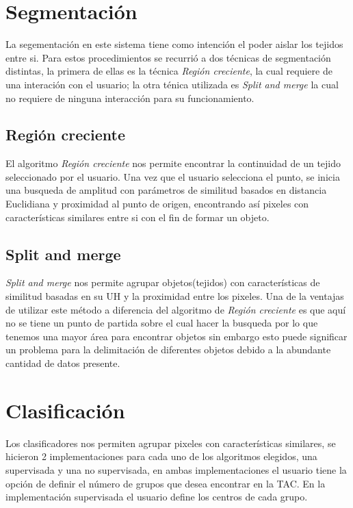 \documentclass[12pt]{report}
\begin{document}
\section{Segmentación}
La segementación en este sistema tiene como intención el poder aislar los tejidos entre si. Para estos procedimientos se recurrió  a dos técnicas de segmentación distintas, la primera de ellas es la técnica \textit{Región creciente}, la cual requiere de una interación con el usuario; la otra ténica utilizada es \textit{Split and merge} la cual no requiere de ninguna interacción para su funcionamiento.

\subsection{Región creciente}
El algoritmo \textit{Región creciente} nos permite encontrar la continuidad de un tejido seleccionado por el usuario. Una vez que el usuario selecciona el punto, se inicia una busqueda de amplitud con parámetros de similitud basados en distancia Euclidiana y proximidad al punto de origen, encontrando así pixeles con características similares entre si con el fin de formar un objeto.

\subsection{Split and merge}
\textit{Split and merge} nos permite agrupar objetos(tejidos) con características de similitud basadas en su UH y la proximidad entre los pixeles. Una de la ventajas de utilizar este método a diferencia del algoritmo de \textit{Región creciente} es que aquí no se tiene un punto de partida sobre el cual hacer la busqueda por lo que tenemos una mayor área para encontrar objetos sin embargo esto puede significar un problema para la delimitación de diferentes objetos debido a la abundante cantidad de datos presente.


\section{Clasificación}
Los clasificadores nos permiten agrupar pixeles con características similares, se hicieron 2 implementaciones para cada uno de los algoritmos elegidos, una  supervisada y una no supervisada, en ambas implementaciones el usuario tiene la opción de definir el número de grupos que desea encontrar en la TAC. En la implementación supervisada el usuario define los centros de cada grupo.
\end{document}
